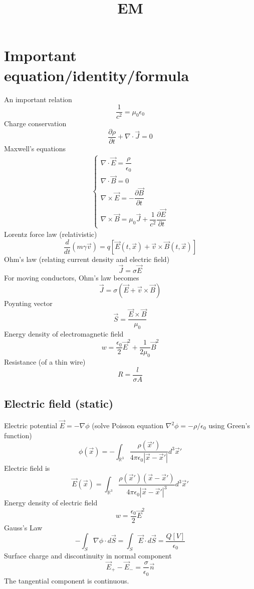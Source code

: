 \documentclass{article}
\title{EM}
\author{ }
\date{ }
\theoremstyle{definition}
\theoremstyle{remark}
\theoremstyle{plain}
\theoremstyle{definition}
\newcommand{\RR}{\mathbb{R}}
\begin{document}
\maketitle
\section{Important equation/identity/formula}
An important relation
\[\dfrac{1}{c^2}=\mu_0\epsilon_0\]
Charge conservation
\[\dfrac{\partial\rho}{\partial t}+\nabla\cdot\vec J=0\]
Maxwell's equations
\begin{align*}
    \begin{cases}
    \nabla\cdot\vec E=\dfrac{\rho}{\epsilon_0}\\
    \nabla\cdot \vec B=0\\
    \nabla\times \vec E=-\dfrac{\partial\vec B}{\partial t}\\
    \nabla\times \vec B=\mu_0 \vec J+\dfrac{1}{c^2}\dfrac{\partial \vec E}{\partial t}
    \end{cases}
\end{align*}
Lorentz force law (relativistic)
\[\dfrac{d}{dt}(m\gamma \vec v)=q[\vec E(t,\vec x)+\vec v\times \vec B(t,\vec x)]\]
Ohm's law (relating current density and electric field)
\[\vec J=\sigma\vec E\]
For moving conductors, Ohm's law becomes
\[\vec J=\sigma(\vec E+\vec v\times\vec B)\]
Poynting vector
\[\vec S=\dfrac{\vec E\times\vec B}{\mu_0}\]
Energy density of electromagnetic field
\[w=\dfrac{\epsilon_0}{2}\vec E^2+\dfrac{1}{2\mu_0}\vec B^2\]
Resistance (of a thin wire)
\[R=\dfrac{l}{\sigma A}\]

\subsection{Electric field (static)}
Electric potential $\vec E=-\nabla\phi$ (solve Poisson equation $\nabla^2\phi=-\rho/\epsilon_0$ using Green's function)
\[\phi(\vec x)=-\int_{\RR^3}\dfrac{\rho(\vec x')}{4\pi\epsilon_0|\vec x-\vec x'|}d^3\vec x'\]
Electric field is
\[\vec E(\vec x)=\int_{\RR^3}\dfrac{\rho(\vec x')(\vec x-\vec x')}{4\pi\epsilon_0|\vec x-\vec x'|^3}d^3\vec x'\]
Energy density of electric field
\[w=\dfrac{\epsilon_0}{2}\vec E^2\]
Gauss's Law
\[-\int_S\nabla\phi\cdot d\vec S=\int_S \vec E\cdot d\vec S=\dfrac{Q[V]}{\epsilon_0}\]
Surface charge and discontinuity in normal component
\[\vec E_+-\vec E_-=\dfrac{\sigma}{\epsilon_0}\vec n\]
The tangential component is continuous.
\end{document}
